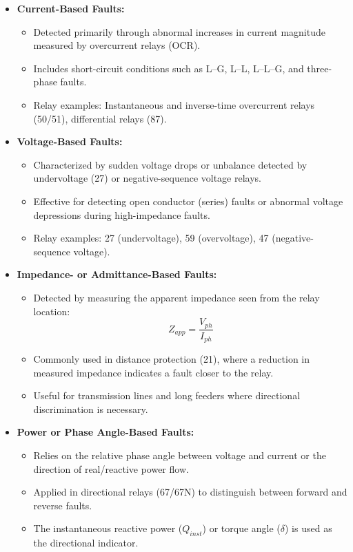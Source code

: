 \begin{itemize}
\item \textbf{Current-Based Faults:}
\begin{itemize}
\item Detected primarily through abnormal increases in current magnitude measured by overcurrent relays (OCR).
\item Includes short-circuit conditions such as L--G, L--L, L--L--G, and three-phase faults.
\item Relay examples: Instantaneous and inverse-time overcurrent relays (50/51), differential relays (87).
\end{itemize}

\item \textbf{Voltage-Based Faults:}
\begin{itemize}
\item Characterized by sudden voltage drops or unbalance detected by undervoltage (27) or negative-sequence voltage relays.
\item Effective for detecting open conductor (series) faults or abnormal voltage depressions during high-impedance faults.
\item Relay examples: 27 (undervoltage), 59 (overvoltage), 47 (negative-sequence voltage).
\end{itemize}

\item \textbf{Impedance- or Admittance-Based Faults:}
\begin{itemize}
\item Detected by measuring the apparent impedance seen from the relay location:
\[
Z_{app} = \frac{V_{ph}}{I_{ph}}
\]
\item Commonly used in distance protection (21), where a reduction in measured impedance indicates a fault closer to the relay.
\item Useful for transmission lines and long feeders where directional discrimination is necessary.
\end{itemize}

\item \textbf{Power or Phase Angle-Based Faults:}
\begin{itemize}
\item Relies on the relative phase angle between voltage and current or the direction of real/reactive power flow.
\item Applied in directional relays (67/67N) to distinguish between forward and reverse faults.
\item The instantaneous reactive power (\(Q_{inst}\)) or torque angle (\(\delta\)) is used as the directional indicator.
\end{itemize}


\end{itemize}
